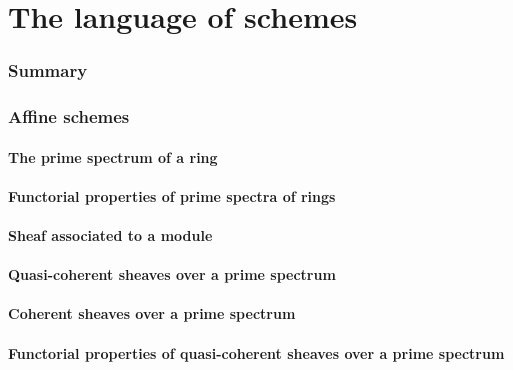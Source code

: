 \documentclass[10pt,oneside]{amsart}
\begin{document}
\clearpage


\setcounter{subsection}{0}
\part{The language of schemes}
    
    \section*{Summary}
    

    \section{Affine schemes}
       
        \subsection{The prime spectrum of a ring}
        
       
        \subsection{Functorial properties of prime spectra of rings}
        
       
        \subsection{Sheaf associated to a module}
        
       
        \subsection{Quasi-coherent sheaves over a prime spectrum}
        
      
        \subsection{Coherent sheaves over a prime spectrum}
        
       
        \subsection{Functorial properties of quasi-coherent sheaves over a prime spectrum}
        
       
\end{document}
